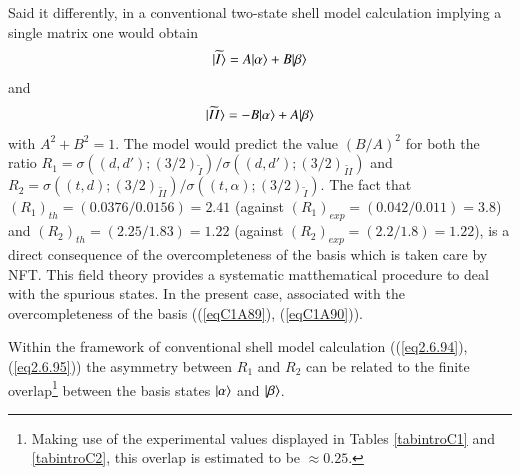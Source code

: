Said it differently, in a conventional two-state shell model calculation implying a single matrix one would obtain
  \begin{align}\label{eq2.6.94} 
|{\widetilde I} \rangle=A|{\alpha} \rangle+B|{\beta} \rangle
\end{align} 
and
  \begin{align}\label{eq2.6.95} 
|{\widetilde {II}} \rangle=-B|{\alpha} \rangle+A|{\beta} \rangle
\end{align} 
with $A^2+B^2=1$. The model would predict the value $(B/A)^2$ for both the ratio $R_1=\sigma((d,d');(3/2)_{\widetilde I})/\sigma((d,d');(3/2)_{\widetilde {II}})$ and $R_2=\sigma((t,d);(3/2)_{\widetilde {II}})/\sigma((t,\alpha);(3/2)_{\widetilde {I}})$. The fact that $(R_1)_{th}=(0.0376/0.0156)=2.41$ (against $(R_1)_{exp}=(0.042/0.011)=3.8$) and $(R_2)_{th}=(2.25/1.83)=1.22$ (against $(R_2)_{exp}=(2.2/1.8)=1.22$), is a direct consequence of the overcompleteness of the basis which is taken care by NFT. This field theory provides a systematic matthematical procedure to deal with the spurious states. In the present case, associated with the overcompleteness of the basis ((\ref{eqC1A89}), (\ref{eqC1A90})).

Within the framework of conventional shell model calculation ((\ref{eq2.6.94}), (\ref{eq2.6.95})) the asymmetry between $R_1$ and $R_2$ can be related to the finite overlap\footnote{Making use of the experimental values displayed in Tables \ref{tabintroC1} and  \ref{tabintroC2}, this overlap is estimated to be $\approx0.25$.} between the basis states $|{\alpha} \rangle$ and $|{\beta} \rangle$.


